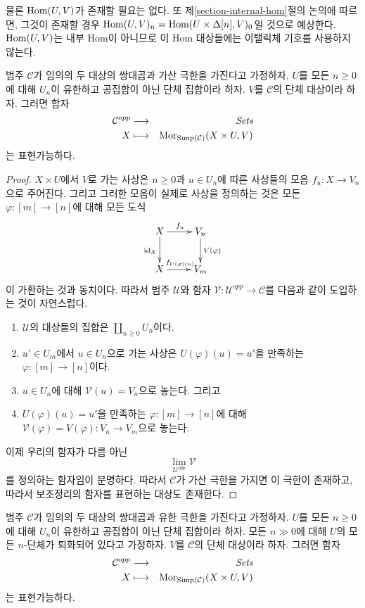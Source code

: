\noindent
물론 $\mathop{\mathrm{Hom}}\nolimits(U, V)$가 존재할 필요는 없다.
또 제\ref{section-internal-hom}절의 논의에 따르면, 그것이 존재할 경우
$\mathop{\mathrm{Hom}}\nolimits(U, V)_n = \mathop{\mathrm{Hom}}\nolimits(U \times \Delta[n], V)_0$일 것으로 예상한다.
$\mathop{\mathrm{Hom}}\nolimits(U, V)$는 내부 Hom이 아니므로 이 Hom 대상들에는 이탤릭체 기호를
사용하지 않는다.

\begin{lemma}
\label{lemma-exists-hom-0-from-simplicial-set}
범주 $\mathcal{C}$가 임의의 두 대상의 쌍대곱과 가산 극한을 가진다고
가정하자. $U$를 모든 $n \geq 0$에 대해 $U_n$이 유한하고
공집합이 아닌 단체 집합이라 하자.
$V$를 $\mathcal{C}$의 단체 대상이라 하자. 그러면 함자
\begin{eqnarray*}
\mathcal{C}^{opp} & \longrightarrow & \textit{Sets} \\
X
& \longmapsto &
\mathop{\mathrm{Mor}}\nolimits_{\text{Simp}(\mathcal{C})}(X \times U, V)
\end{eqnarray*}
는 표현가능하다.
\end{lemma}

\begin{proof}
$X \times U$에서 $V$로 가는 사상은 $n \geq 0$과 $u \in U_n$에 따른
사상들의 모음 $f_u : X \to V_n$으로 주어진다.
그리고 그러한 모음이 실제로 사상을 정의하는 것은 모든
$\varphi : [m] \to [n]$에 대해 모든 도식
$$
\xymatrix{
X \ar[r]^{f_u} \ar[d]_{\text{id}_X} & V_n \ar[d]^{V(\varphi)} \\
X \ar[r]^{f_{U(\varphi)(u)}} & V_m
}
$$
이 가환하는 것과 동치이다. 따라서 범주 $\mathcal{U}$와 함자
$\mathcal{V} : \mathcal{U}^{opp} \to \mathcal{C}$를 다음과 같이
도입하는 것이 자연스럽다.
\begin{enumerate}
\item $\mathcal{U}$의 대상들의 집합은 $\coprod_{n \geq 0} U_n$이다.
\item $u' \in U_m$에서 $u \in U_n$으로 가는 사상은
$U(\varphi)(u) = u'$을 만족하는 $\varphi : [m] \to [n]$이다.
\item $u \in U_n$에 대해 $\mathcal{V}(u) = V_n$으로 놓는다. 그리고
\item $U(\varphi)(u) = u'$을 만족하는 $\varphi : [m] \to [n]$에 대해
$\mathcal{V}(\varphi) = V(\varphi) : V_n \to V_m$으로 놓는다.
\end{enumerate}
이제 우리의 함자가 다름 아닌
$$
\lim_{\mathcal{U}^{opp}} \mathcal{V}
$$
를 정의하는 함자임이 분명하다. 따라서 $\mathcal{C}$가 가산 극한을
가지면 이 극한이 존재하고, 따라서 보조정리의 함자를 표현하는 대상도
존재한다.
\end{proof}

\begin{lemma}
\label{lemma-exists-hom-0-from-simplicial-set-finite}
범주 $\mathcal{C}$가 임의의 두 대상의 쌍대곱과 유한 극한을 가진다고
가정하자. $U$를 모든 $n \geq 0$에 대해 $U_n$이 유한하고
공집합이 아닌 단체 집합이라 하자.
모든 $n \gg 0$에 대해 $U$의 모든 $n$-단체가 퇴화되어 있다고
가정하자. $V$를 $\mathcal{C}$의 단체 대상이라 하자. 그러면 함자
\begin{eqnarray*}
\mathcal{C}^{opp} & \longrightarrow & \textit{Sets} \\
X
& \longmapsto &
\mathop{\mathrm{Mor}}\nolimits_{\text{Simp}(\mathcal{C})}(X \times U, V)
\end{eqnarray*}
는 표현가능하다.
\end{lemma}

